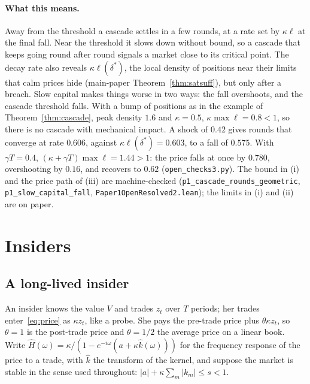 \documentclass[12pt]{article}
\theoremstyle{definition}
\theoremstyle{remark}
\begin{document}
\paragraph{What this means.} Away from the threshold a cascade settles in a few rounds, at a rate set by $\kappa\ell$ at the final fall. Near the threshold it slows down without bound, so a cascade that keeps going round after round signals a market close to its critical point. The decay rate also reveals $\kappa\ell(\delta^*)$, the local density of positions near their limits that calm prices hide (main-paper Theorem~\ref{thm:satsuff}), but only after a breach. Slow capital makes things worse in two ways: the fall overshoots, and the cascade threshold falls. With a bump of positions as in the example of Theorem~\ref{thm:cascade}, peak density $1.6$ and $\kappa=0.5$, $\kappa\max\ell=0.8<1$, so there is no cascade with mechanical impact. A shock of $0.42$ gives rounds that converge at rate $0.606$, against $\kappa\ell(\delta^*)=0.603$, to a fall of $0.575$. With $\gamma T=0.4$, $(\kappa+\gamma T)\max\ell=1.44>1$: the price falls at once by $0.780$, overshooting by $0.16$, and recovers to $0.62$ (\nolinkurl{open_checks3.py}). The bound in (i) and the price path of (iii) are machine-checked (\texttt{p1\_cascade\_rounds\_geometric}, \texttt{p1\_slow\_capital\_fall}, \nolinkurl{Paper1OpenResolved2.lean}); the limits in (i) and (ii) are on paper.

\section{Insiders}

\subsection{A long-lived insider}

An insider knows the value $V$ and trades $z_t$ over $T$ periods; her trades enter~\eqref{eq:price} as $\kappa z_t$, like a probe. She pays the pre-trade price plus $\theta\kappa z_t$, so $\theta=1$ is the post-trade price and $\theta=1/2$ the average price on a linear book. Write $\hat H(\omega)=\kappa/(1-e^{-i\omega}(a+\kappa\hat k(\omega)))$ for the frequency response of the price to a trade, with $\hat k$ the transform of the kernel, and suppose the market is stable in the sense used throughout: $|a|+\kappa\sum_m|k_m|\le s<1$.
\end{document}
